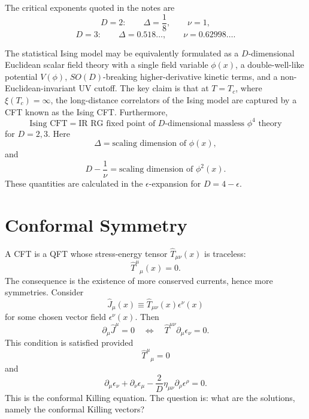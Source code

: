 \begin{center}
\end{center}

The critical exponents quoted in the notes are
\[
  D=2:\qquad \Delta=\frac18,\qquad \nu=1,
\]
\[
  D=3:\qquad \Delta=0.518\ldots,\qquad \nu=0.62998\ldots.
\]

The statistical Ising model may be equivalently formulated as a
\(D\)-dimensional Euclidean scalar field theory with a single field
variable \(\phi(x)\), a double-well-like potential \(V(\phi)\),
\(SO(D)\)-breaking higher-derivative kinetic terms, and a
non-Euclidean-invariant UV cutoff.  The key claim is that at
\(T=T_c\), where \(\xi(T_c)=\infty\), the long-distance correlators of
the Ising model are captured by a CFT known as the Ising CFT.
Furthermore,
\[
  \text{Ising CFT}
  =
  \text{IR RG fixed point of \(D\)-dimensional massless \(\phi^4\) theory}
\]
for \(D=2,3\).  Here
\[
  \Delta=\text{scaling dimension of }\phi(x),
\]
and
\[
  D-\frac1\nu=\text{scaling dimension of }\phi^2(x).
\]
These quantities are calculated in the \(\epsilon\)-expansion for
\(D=4-\epsilon\).

\section{Conformal Symmetry}

A CFT is a QFT whose stress-energy tensor \(\widehat T_{\mu\nu}(x)\) is
traceless:
\[
  \widehat T^\mu{}_\mu(x)=0.
\]
The consequence is the existence of more conserved currents, hence more
symmetries.  Consider
\[
  \widehat J_\mu(x)\equiv \widehat T_{\mu\nu}(x)\epsilon^\nu(x)
\]
for some chosen vector field \(\epsilon^\nu(x)\).  Then
\[
  \partial_\mu\widehat J^\mu=0
  \quad\Longleftrightarrow\quad
  \widehat T^{\mu\nu}\partial_\mu\epsilon_\nu=0.
\]
This condition is satisfied provided
\[
  \widehat T^\mu{}_\mu=0
\]
and
\[
  \partial_\mu\epsilon_\nu+\partial_\nu\epsilon_\mu
  -\frac2D\eta_{\mu\nu}\partial_\rho\epsilon^\rho=0.
\]
This is the conformal Killing equation.  The question is: what are the
solutions, namely the conformal Killing vectors?

